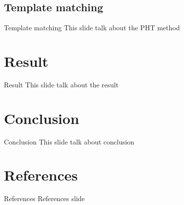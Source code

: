 \documentclass{beamer}
\begin{document}
\subsection{Template matching}
\begin{frame}{Template matching}
	This slide talk about the PHT method
\end{frame}
\section{Result}
\begin{frame}{Result}
	This slide talk about the result
\end{frame}
\section{Conclusion}
\begin{frame}{Conclusion}
	This slide talk about conclusion
\end{frame}
\section{References}
\begin{frame}{References}
	References slide
\end{frame}
\end{document}
